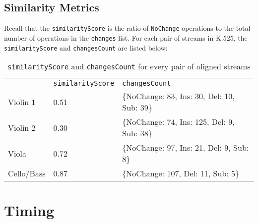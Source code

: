 \subsection{Similarity Metrics}
Recall that the \texttt{similarityScore} is the ratio of \texttt{NoChange} operations to the total number of operations in the \texttt{changes} list. For each pair of streams in K.525, the \texttt{similarityScore} and \texttt{changesCount} are listed below:
\begin{table}[H]
\centering
\begin{tabular}{lll}
           & \texttt{similarityScore} & \texttt{changesCount}                                                  \\
Violin 1   & 0.51                       & \{NoChange: 83, Ins: 30, Del: 10, Sub: 39\} \\
Violin 2   & 0.30                       & \{NoChange: 74, Ins: 125, Del: 9, Sub: 38\} \\
Viola      & 0.72                       & \{NoChange: 97, Ins: 21, Del: 9, Sub: 8\}   \\
Cello/Bass & 0.87                       & \{NoChange: 107, Del: 11, Sub: 5\}               
\end{tabular}
\caption{\texttt{similarityScore} and \texttt{changesCount} for every pair of aligned streams}
\end{table}


\section{Timing} \label{timing}

